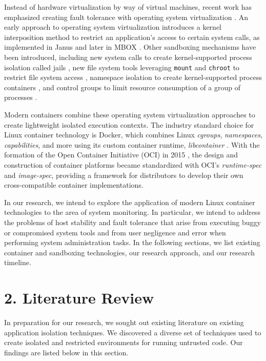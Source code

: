 \documentclass{proc}
\begin{document}
Instead of hardware virtualization by way of virtual machines, recent work has emphasized creating fault tolerance with operating system virtualization \cite{soltesz2007container}. An early approach to operating system virtualization introduces a kernel interposition method to restrict an application's access to certain system calls, as implemented in Janus \cite{goldberg1996janus} and later in MBOX \cite{kim2013mbox}. Other sandboxing mechanisms have been introduced, including new system calls to create kernel-supported process isolation called jails \cite{kamp2000jails}, new file system tools leveraging \texttt{mount} and \texttt{chroot} to restrict file system access \cite{prevelakis2001fmac}, namespace isolation to create kernel-supported process containers \cite{biederman2006namespaces, menage2007containers}, and control groups to limit resource consumption of a group of processes \cite{menagecgroups}.

Modern containers combine these operating system virtualization approaches to create lightweight isolated execution contexts. The industry standard choice for Linux container technology is Docker, which combines Linux \textit{cgroups}, \textit{namespaces}, \textit{capabilities}, and more using its custom container runtime, \textit{libcontainer} \cite{hykes2014libcontainer}. With the formation of the Open Container Initiative (OCI) in 2015 \cite{opencontainerinitiative}, the design and construction of container platforms became standardized with OCI's \textit{runtime-spec} and \textit{image-spec}, providing a framework for distributors to develop their own cross-compatible container implementations.

In our research, we intend to explore the application of modern Linux container technologies to the area of system monitoring. In particular, we intend to address the problems of host stability and fault tolerance that arise from executing buggy or compromised system tools and from user negligence and error when performing system administration tasks. In the following sections, we list existing container and sandboxing technologies, our research approach, and our research timeline.

\section*{2. Literature Review}

In preparation for our research, we sought out existing literature on existing application isolation techniques. We discovered a diverse set of techniques used to create isolated and restricted environments for running untrusted code. Our findings are listed below in this section.
\end{document}
